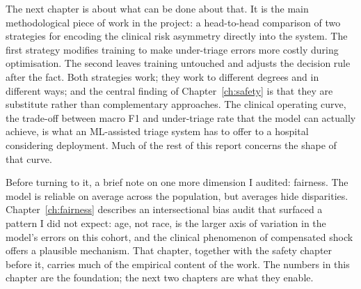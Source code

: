 The next chapter is about what can be done about that. It is the main methodological piece of work in the project: a head-to-head comparison of two strategies for encoding the clinical risk asymmetry directly into the system. The first strategy modifies training to make under-triage errors more costly during optimisation. The second leaves training untouched and adjusts the decision rule after the fact. Both strategies work; they work to different degrees and in different ways; and the central finding of Chapter~\ref{ch:safety} is that they are substitute rather than complementary approaches. The clinical operating curve, the trade-off between macro F1 and under-triage rate that the model can actually achieve, is what an ML-assisted triage system has to offer to a hospital considering deployment. Much of the rest of this report concerns the shape of that curve.

Before turning to it, a brief note on one more dimension I audited: fairness. The model is reliable on average across the population, but averages hide disparities. Chapter~\ref{ch:fairness} describes an intersectional bias audit that surfaced a pattern I did not expect: age, not race, is the larger axis of variation in the model's errors on this cohort, and the clinical phenomenon of compensated shock offers a plausible mechanism. That chapter, together with the safety chapter before it, carries much of the empirical content of the work. The numbers in this chapter are the foundation; the next two chapters are what they enable.
